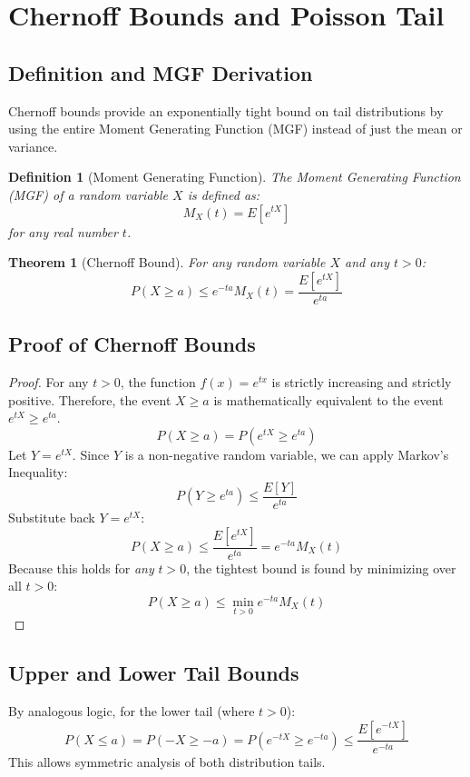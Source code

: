 \documentclass{article}
\newtheorem{theorem}{Theorem}
\newtheorem{definition}{Definition}
\begin{document}
\section{Chernoff Bounds and Poisson Tail}

\subsection{Definition and MGF Derivation}
Chernoff bounds provide an exponentially tight bound on tail distributions by using the entire Moment Generating Function (MGF) instead of just the mean or variance.

\begin{definition}[Moment Generating Function]
The Moment Generating Function (MGF) of a random variable $X$ is defined as:
\[ M_X(t) = E[e^{tX}] \]
for any real number $t$.
\end{definition}

\begin{theorem}[Chernoff Bound]
For any random variable $X$ and any $t > 0$:
\[ P(X \ge a) \le e^{-ta} M_X(t) = \frac{E[e^{tX}]}{e^{ta}} \]
\end{theorem}

\subsection{Proof of Chernoff Bounds}
\begin{proof}
For any $t > 0$, the function $f(x) = e^{tx}$ is strictly increasing and strictly positive.
Therefore, the event $X \ge a$ is mathematically equivalent to the event $e^{tX} \ge e^{ta}$.
\[ P(X \ge a) = P(e^{tX} \ge e^{ta}) \]
Let $Y = e^{tX}$. Since $Y$ is a non-negative random variable, we can apply Markov's Inequality:
\[ P(Y \ge e^{ta}) \le \frac{E[Y]}{e^{ta}} \]
Substitute back $Y = e^{tX}$:
\[ P(X \ge a) \le \frac{E[e^{tX}]}{e^{ta}} = e^{-ta} M_X(t) \]
Because this holds for \textit{any} $t > 0$, the tightest bound is found by minimizing over all $t > 0$:
\[ P(X \ge a) \le \min_{t > 0} e^{-ta} M_X(t) \]
\end{proof}

\subsection{Upper and Lower Tail Bounds}
By analogous logic, for the lower tail (where $t > 0$):
\[ P(X \le a) = P(-X \ge -a) = P(e^{-tX} \ge e^{-ta}) \le \frac{E[e^{-tX}]}{e^{-ta}} \]
This allows symmetric analysis of both distribution tails.
\end{document}
